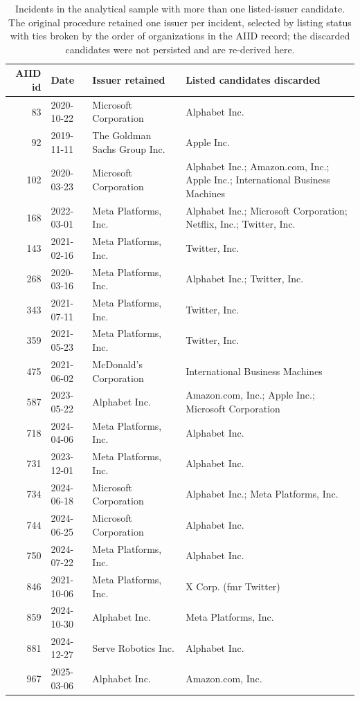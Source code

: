 \documentclass[11pt]{article}
\begin{document}
\begin{table}[H]
\caption{Incidents in the analytical sample with more than one listed-issuer candidate. The original procedure retained one issuer per incident, selected by listing status with ties broken by the order of organizations in the AIID record; the discarded candidates were not persisted and are re-derived here.}
\centering\scriptsize
\begin{tabular}{@{}rlp{4.2cm}p{5.4cm}@{}}
\toprule
AIID id & Date & Issuer retained & Listed candidates discarded \\ \midrule
83 & 2020-10-22 & Microsoft Corporation & Alphabet Inc. \\
92 & 2019-11-11 & The Goldman Sachs Group Inc. & Apple Inc. \\
102 & 2020-03-23 & Microsoft Corporation & Alphabet Inc.; Amazon.com, Inc.; Apple Inc.; International Business Machines \\
168 & 2022-03-01 & Meta Platforms, Inc. & Alphabet Inc.; Microsoft Corporation; Netflix, Inc.; Twitter, Inc. \\
143 & 2021-02-16 & Meta Platforms, Inc. & Twitter, Inc. \\
268 & 2020-03-16 & Meta Platforms, Inc. & Alphabet Inc.; Twitter, Inc. \\
343 & 2021-07-11 & Meta Platforms, Inc. & Twitter, Inc. \\
359 & 2021-05-23 & Meta Platforms, Inc. & Twitter, Inc. \\
475 & 2021-06-02 & McDonald's Corporation & International Business Machines \\
587 & 2023-05-22 & Alphabet Inc. & Amazon.com, Inc.; Apple Inc.; Microsoft Corporation \\
718 & 2024-04-06 & Meta Platforms, Inc. & Alphabet Inc. \\
731 & 2023-12-01 & Meta Platforms, Inc. & Alphabet Inc. \\
734 & 2024-06-18 & Microsoft Corporation & Alphabet Inc.; Meta Platforms, Inc. \\
744 & 2024-06-25 & Microsoft Corporation & Alphabet Inc. \\
750 & 2024-07-22 & Meta Platforms, Inc. & Alphabet Inc. \\
846 & 2021-10-06 & Meta Platforms, Inc. & X Corp. (fmr Twitter) \\
859 & 2024-10-30 & Alphabet Inc. & Meta Platforms, Inc. \\
881 & 2024-12-27 & Serve Robotics Inc. & Alphabet Inc. \\
967 & 2025-03-06 & Alphabet Inc. & Amazon.com, Inc. \\

\end{tabular}
\end{table}
\end{document}
